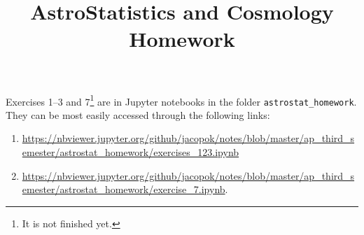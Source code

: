 \documentclass[11pt]{article}
\title{AstroStatistics and Cosmology Homework}
\begin{document}
\maketitle
\tableofcontents

Exercises 1--3 and 7\footnote{It is not finished yet.} are in Jupyter notebooks in the folder \texttt{astrostat\_homework}.
They can be most easily accessed through the following links: 
\begin{enumerate}
    \item \url{https://nbviewer.jupyter.org/github/jacopok/notes/blob/master/ap_third_semester/astrostat_homework/exercises_123.ipynb}
    \item \url{https://nbviewer.jupyter.org/github/jacopok/notes/blob/master/ap_third_semester/astrostat_homework/exercise_7.ipynb}.
\end{enumerate}




\printbibliography
\end{document}
